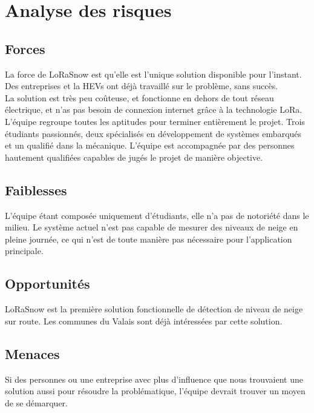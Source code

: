 \section{Analyse des risques}
\subsection{Forces}
La force de LoRaSnow est qu'elle est l'unique solution disponible pour l'instant.
Des entreprises et la HEVs ont déjà travaillé sur le problème, sans succès.\\[0.2cm]
La solution est très peu coûteuse, et fonctionne en dehors de tout réseau électrique,
et n'as pas besoin de connexion internet grâce à la technologie LoRa.\\[0.2cm]
L'équipe regroupe toutes les aptitudes pour terminer entièrement le projet.
Trois étudiants passionnés, deux spécialisés en développement de systèmes embarqués
et un qualifié dans la mécanique.
L'équipe est accompagnée par des personnes hautement qualifiées capables de jugés le
projet de manière objective.

\subsection{Faiblesses}
L'équipe étant composée uniquement d'étudiants, elle n'a pas de notoriété dans le milieu.
Le système actuel n'est pas capable de mesurer des niveaux de neige en pleine journée,
ce qui n'est de toute manière pas nécessaire pour l'application principale.

\subsection{Opportunités}
LoRaSnow est la première solution fonctionnelle de détection de niveau de neige
sur route. Les communes du Valais sont déjà intéressées par cette solution.

\subsection{Menaces}
Si des personnes ou une entreprise avec plus d’influence que nous trouvaient
une solution aussi pour résoudre la problématique, l’équipe devrait trouver un 
moyen de se démarquer.
